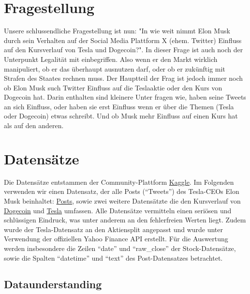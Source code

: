 \documentclass{article}
\begin{document}
\section{Fragestellung}
Unsere schlussendliche Fragestellung ist nun: "In wie weit nimmt Elon Musk durch sein Verhalten auf der Social Media Plattform X (ehem. Twitter) Einfluss auf den Kursverlauf von Tesla und Dogecoin?". In dieser Frage ist auch noch der Unterpunkt Legalität mit einbegriffen. Also wenn er den Markt wirklich manipuliert, ob er das überhaupt ausnutzen darf, oder ob er zukünftig mit Strafen des Staates rechnen muss. Der Hauptteil der Frag ist jedoch immer noch ob Elon Musk such Twitter Einfluss auf die Teslaaktie oder den Kurs von Dogecoin hat. Darin enthalten sind kleinere Unter fragen wie, haben seine Tweets an sich Einfluss, oder haben sie erst Einfluss wenn er über die Themen (Tesla oder Dogecoin) etwas schreibt. Und ob Musk mehr Einfluss auf einen Kurs hat als auf den anderen. 



\section{Datensätze}
Die Datensätze entstammen der Community-Plattform \href{https://www.kaggle.com/datasets/dhruvildave/dogecoin-historical-data}{Kaggle}.
Im Folgenden verwenden wir einen Datensatz, der alle Posts (``Tweets'') des Tesla-CEOs Elon Musk  beinhaltet: \href{https://www.kaggle.com/datasets/aryansingh0909/elon-musk-tweets-updated-daily}{Posts}, sowie zwei weitere Datensätzte die den Kursverlauf von \href{https://www.kaggle.com/datasets/dhruvildave/dogecoin-historical-datay}{Dogecoin} und \href{https://www.kaggle.com/datasets/dhruvildave/dogecoin-historical-datay}{Tesla} umfassen.
Alle Datensätze vermitteln einen seriösen und schlüssigen Eindruck, was unter anderem an den fehlerfreien Werten liegt.
Zudem wurde der Tesla-Datensatz an den Aktiensplit angepasst und wurde unter Verwendung der offiziellen Yahoo Finance API erstellt.
Für die Auswertung werden insbesondere die Zeilen ``date'' und ``raw\_close'' der Stock-Datensätze, sowie die Spalten ``datetime'' und ``text'' des Post-Datensatzes betrachtet.

\subsection{Dataunderstanding}
\end{document}

